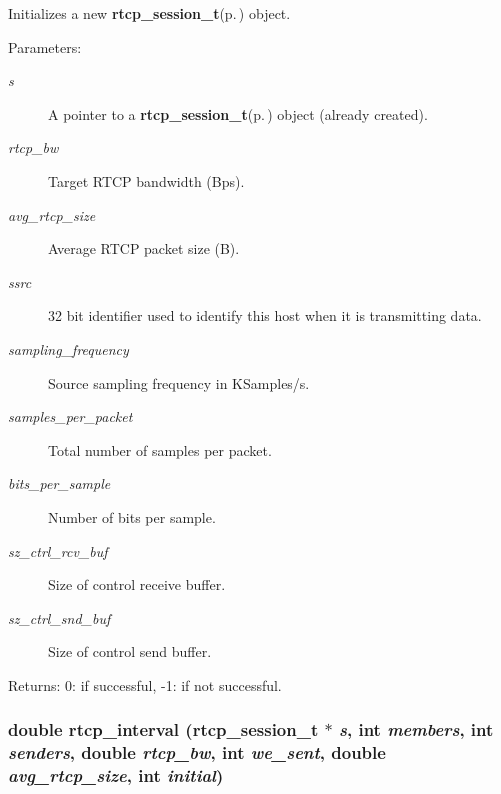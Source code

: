Initializes a new {\bf rtcp\_\-session\_\-t}{\rm (p.\,\pageref{structrtcp__session__t})} object. \begin{Desc}
\item[Parameters:]
\begin{description}
\item[{\em s}]A pointer to a {\bf rtcp\_\-session\_\-t}{\rm (p.\,\pageref{structrtcp__session__t})} object (already created). \item[{\em rtcp\_\-bw}]Target RTCP bandwidth (Bps). \item[{\em avg\_\-rtcp\_\-size}]Average RTCP packet size (B). \item[{\em ssrc}]32 bit identifier used to identify this host when it is transmitting data. \item[{\em sampling\_\-frequency}]Source sampling frequency in KSamples/s. \item[{\em samples\_\-per\_\-packet}]Total number of samples per packet. \item[{\em bits\_\-per\_\-sample}]Number of bits per sample. \item[{\em sz\_\-ctrl\_\-rcv\_\-buf}]Size of control receive buffer. \item[{\em sz\_\-ctrl\_\-snd\_\-buf}]Size of control send buffer. \end{description}
\end{Desc}
\begin{Desc}
\item[Returns:]0: if successful, -1: if not successful. \end{Desc}
\subsubsection{\setlength{\rightskip}{0pt plus 5cm}double rtcp\_\-interval ({\bf rtcp\_\-session\_\-t} $\ast$ {\em s}, int {\em members}, int {\em senders}, double {\em rtcp\_\-bw}, int {\em we\_\-sent}, double {\em avg\_\-rtcp\_\-size}, int {\em initial})\hspace{0.3cm}{\tt  [static]}}\label{rtcp_8c_a17}


